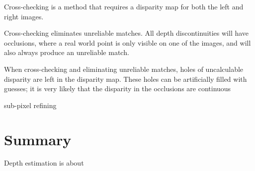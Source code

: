 Cross-checking is a method that requires a disparity map for both the
left and right images.

Cross-checking eliminates unreliable matches. All depth
discontinuities will have occlusions, where a real world point is only
visible on one of the images, and will also always produce an
unreliable match.

When cross-checking and eliminating unreliable matches, holes of
uncalculable disparity are left in the disparity map. These holes can
be artificially filled with guesses; it is very likely that the
disparity in the occlusions are continuous

sub-pixel refining

\section{Summary}

Depth estimation is about
